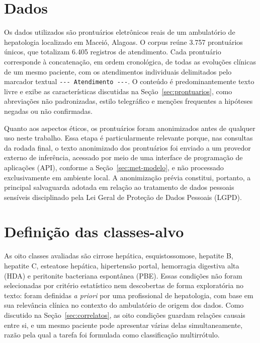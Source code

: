 \section{Dados}\label{sec:met-dados}

Os dados utilizados são prontuários eletrônicos reais de um ambulatório de hepatologia localizado em Maceió, Alagoas.
O corpus reúne 3.757 prontuários únicos, que totalizam 6.405 registros de atendimento. Cada prontuário corresponde à concatenação, em ordem cronológica, de todas as evoluções clínicas de um mesmo paciente, com os atendimentos individuais delimitados pelo marcador textual \texttt{-{}-{}- Atendimento -{}-{}-}. O conteúdo é predominantemente texto livre e exibe as características discutidas na Seção~\ref{sec:prontuarios}, como abreviações não padronizadas, estilo telegráfico e menções frequentes a hipóteses negadas ou não confirmadas.

Quanto aos aspectos éticos, os prontuários foram anonimizados antes de qualquer uso neste trabalho.
Essa etapa é particularmente relevante porque, nas consultas da rodada final, o texto anonimizado dos prontuários foi enviado a um provedor externo de inferência, acessado por meio de uma interface de programação de aplicações (API), conforme a Seção~\ref{sec:met-modelo}, e não processado exclusivamente em ambiente local. A anonimização prévia constitui, portanto, a principal salvaguarda adotada em relação ao tratamento de dados pessoais sensíveis disciplinado pela Lei Geral de Proteção de Dados Pessoais (LGPD).

\section{Definição das classes-alvo}\label{sec:met-classes}

As oito classes avaliadas são cirrose hepática, esquistossomose, hepatite B, hepatite C, esteatose hepática, hipertensão portal, hemorragia digestiva alta (HDA) e peritonite bacteriana espontânea (PBE). Essas condições não foram selecionadas por critério estatístico nem descobertas de forma exploratória no texto: foram definidas \textit{a priori} por uma profissional de hepatologia, com base em sua relevância clínica no contexto do ambulatório de origem dos dados. Como discutido na Seção~\ref{sec:correlatos}, as oito condições guardam relações causais entre si, e um mesmo paciente pode apresentar várias delas simultaneamente, razão pela qual a tarefa foi formulada como classificação multirrótulo.

